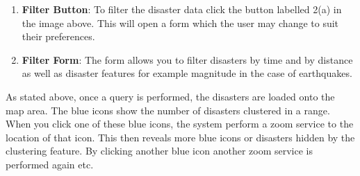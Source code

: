 \begin{enumerate}
		\begin{enumerate}
		\item \textbf{Filter Button}: To filter the disaster data click the button labelled 2(a) in the image above. This will open a form which the user may change to suit their preferences. 
		\item \textbf{Filter Form}: The form allows you to filter disasters by time and by distance as well as disaster features for example magnitude in the case of earthquakes.
		\end{enumerate}
		As stated above, once a query is performed, the disasters are loaded onto the map area. The blue icons show the number of disasters clustered in a range. When you click one of these blue icons, the system perform a zoom service to the location of that icon. This then reveals more blue icons or disasters hidden by the clustering feature. By clicking another blue icon another zoom service is performed again etc.
	\end{enumerate}
